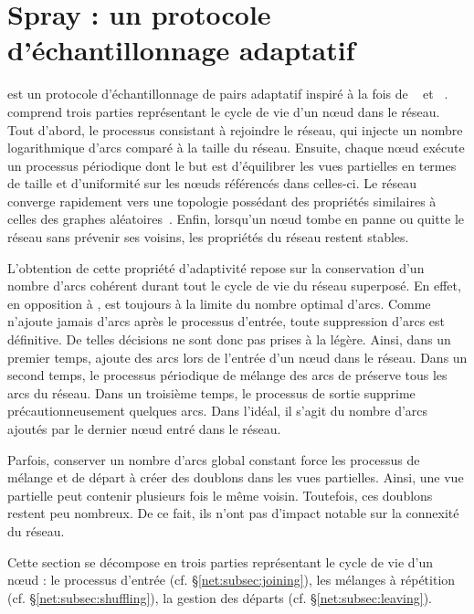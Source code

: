 
\section{Spray : un protocole d'échantillonnage adaptatif}
\label{net:sec:spray}

\SPRAY est un protocole d'échantillonnage de pairs adaptatif inspiré à la fois
de \SCAMP~\cite{ganesh2003peer} et \CYCLON~\cite{voulgaris2005cyclon}. \SPRAY
comprend trois parties représentant le cycle de vie d'un nœud dans le
réseau. Tout d'abord, le processus consistant à rejoindre le réseau, qui injecte
un nombre logarithmique d'arcs comparé à la taille du réseau.  Ensuite, chaque
nœud exécute un processus périodique dont le but est d'équilibrer les vues
partielles en termes de taille et d'uniformité sur les nœuds référencés dans
celles-ci. Le réseau converge rapidement vers une topologie possédant des
propriétés similaires à celles des graphes
aléatoires~\cite{erdos1959random}. Enfin, lorsqu'un nœud tombe en panne ou
quitte le réseau sans prévenir ses voisins, les propriétés du réseau restent
stables.

L'obtention de cette propriété d'adaptivité repose sur la conservation d'un
nombre d'arcs cohérent durant tout le cycle de vie du réseau superposé.  En
effet, en opposition à \CYCLON, \SPRAY est toujours à la limite du nombre
optimal d'arcs. Comme \SPRAY n'ajoute jamais d'arcs après le processus d'entrée,
toute suppression d'arcs est définitive. De telles décisions ne sont donc pas
prises à la légère. Ainsi, dans un premier temps, \SPRAY ajoute des arcs lors de
l'entrée d'un nœud dans le réseau. Dans un second temps, le processus périodique
de mélange des arcs de \SPRAY préserve tous les arcs du réseau.  Dans un
troisième temps, le processus de sortie supprime précautionneusement quelques
arcs. Dans l'idéal, il s'agit du nombre d'arcs ajoutés par le dernier nœud entré
dans le réseau.

Parfois, conserver un nombre d'arcs global constant force les processus de
mélange et de départ à créer des doublons dans les vues partielles. Ainsi, une
vue partielle peut contenir plusieurs fois le même voisin. Toutefois, ces
doublons restent peu nombreux. De ce fait, ils n'ont pas d'impact notable sur la
connexité du réseau.

Cette section se décompose en trois parties représentant le cycle de vie d'un
nœud : le processus d'entrée (cf. §\ref{net:subsec:joining}), les mélanges à
répétition (cf. §\ref{net:subsec:shuffling}), la gestion des départs
(cf. §\ref{net:subsec:leaving}).

